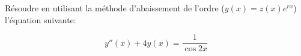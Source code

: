 \exercice 

Résoudre en utilisant la méthode d'abaissement 
de l'ordre ($y(x) = z(x) e^{r x}$) l'équation
suivante:

\begin{equation*}
    y''(x) + 4y(x) = \frac{1}{\cos 2x }
\end{equation*}

